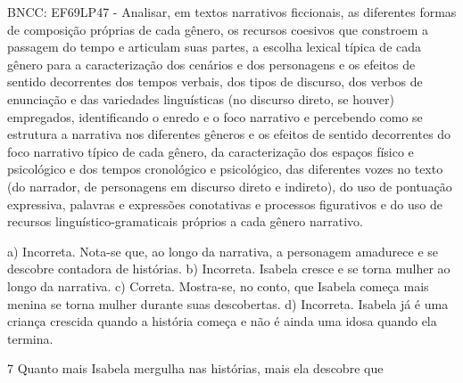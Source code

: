 \begin{itemize}
\begin{itemize}
\begin{escolha}
\begin{escolha}
\begin{escolha}
\begin{escolha}
\begin{escolha}
\begin{escolha}
\begin{escolha}
\begin{escolha}
\begin{escolha}
\begin{escolha}
\begin{escolha}
\begin{escolha}
\begin{escolha}
\begin{escolha}
BNCC: EF69LP47 - Analisar, em textos narrativos ficcionais, as
diferentes formas de composição próprias de cada gênero, os recursos
coesivos que constroem a passagem do tempo e articulam suas partes, a
escolha lexical típica de cada gênero para a caracterização dos cenários
e dos personagens e os efeitos de sentido decorrentes dos tempos
verbais, dos tipos de discurso, dos verbos de enunciação e das
variedades linguísticas (no discurso direto, se houver) empregados,
identificando o enredo e o foco narrativo e percebendo como se estrutura
a narrativa nos diferentes gêneros e os efeitos de sentido decorrentes
do foco narrativo típico de cada gênero, da caracterização dos espaços
físico e psicológico e dos tempos cronológico e psicológico, das
diferentes vozes no texto (do narrador, de personagens em discurso
direto e indireto), do uso de pontuação expressiva, palavras e
expressões conotativas e processos figurativos e do uso de recursos
linguístico-gramaticais próprios a cada gênero narrativo.

a) Incorreta. Nota-se que, ao longo da narrativa, a personagem amadurece
e se descobre contadora de histórias. b) Incorreta. Isabela cresce e se
torna mulher ao longo da narrativa. c) Correta. Mostra-se, no conto, que
Isabela começa mais menina se torna mulher durante suas descobertas. d)
Incorreta. Isabela já é uma criança crescida quando a história começa e
não é ainda uma idosa quando ela termina.

\num{7} Quanto mais Isabela mergulha nas histórias, mais ela descobre
que

\end{escolha}
\end{escolha}
\end{escolha}
\end{escolha}
\end{escolha}
\end{escolha}
\end{escolha}
\end{escolha}
\end{escolha}
\end{escolha}
\end{escolha}
\end{escolha}
\end{escolha}
\end{escolha}
\end{itemize}
\end{itemize}
